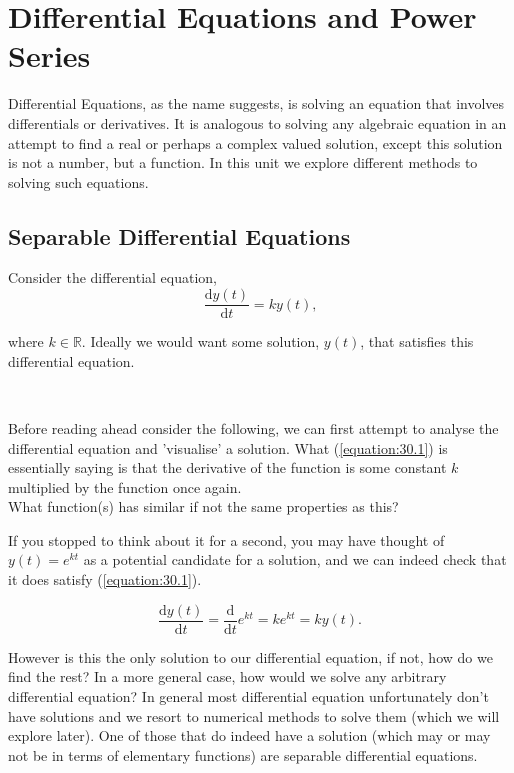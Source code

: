 \chapter{Differential Equations and Power Series}

Differential Equations, as the name suggests, is solving an equation that involves differentials or derivatives. It is analogous to solving any algebraic equation in an attempt to find a real or perhaps a complex valued solution, except this solution is not a number, but a function. In this unit we explore different methods to solving such equations.

\section{Separable Differential Equations}

Consider the differential equation,
\begin{equation}\label{equation:30.1}
\frac{\mathrm{d}y(t)}{\mathrm{d}t}=ky(t)\text{,}
\end{equation}

where $k \in \mathbb{R}$. Ideally we would want some solution, $y(t)$, that satisfies this differential equation.

\begin{thinking}{~}

Before reading ahead consider the following, we can first attempt to analyse the differential equation and 'visualise' a solution. What (\ref{equation:30.1}) is essentially saying is that the derivative of the function is some constant $k$ multiplied by the function once again.
\\
What function(s) has similar if not the same properties as this?
\end{thinking}

If you stopped to think about it for a second, you may have thought of $y(t)=e^{kt}$ as a potential candidate for a solution, and we can indeed check that it does satisfy (\ref{equation:30.1}).

$$\frac{\mathrm{d}y(t)}{\mathrm{d}t}=\frac{\mathrm{d}}{\mathrm{d}t}e^{kt}=ke^{kt}=ky(t)\text{.}$$

However is this the only solution to our differential equation, if not, how do we find the rest? In a more general case, how would we solve any arbitrary differential equation? In general most differential equation unfortunately don't have solutions and we resort to numerical methods to solve them (which we will explore later). One of those that do indeed have a solution (which may or may not be in terms of elementary functions) are separable differential equations.

